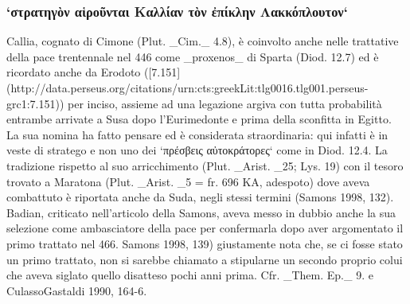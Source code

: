 {            \subsubsection{`στρατηγὸν αἱροῦνται Καλλίαν τὸν ἐπίκλην Λακκόπλουτον`}
            Callia, cognato di  Cimone (Plut. _Cim._ 4.8), è coinvolto anche nelle trattative della pace trentennale nel 446 come _proxenos_ di Sparta (Diod. 12.7) ed è ricordato anche da Erodoto ([7.151](http://data.perseus.org/citations/urn:cts:greekLit:tlg0016.tlg001.perseus-grc1:7.151)) per inciso, assieme ad una legazione argiva con tutta probabilità entrambe arrivate a Susa dopo l'Eurimedonte e prima della sconfitta in Egitto. La sua nomina ha fatto pensare ed è considerata straordinaria: qui infatti è in veste di stratego e non uno dei `πρέσβεις αὐτοκράτορες` come in Diod. 12.4. La tradizione rispetto al suo arricchimento (Plut. _Arist. _25; Lys. 19) con il tesoro trovato a Maratona (Plut. _Arist. _5 = fr. 696 KA, adespoto) dove aveva combattuto è riportata anche da Suda, negli stessi termini  (Samons 1998, 132). Badian, criticato nell'articolo della Samons, aveva messo in dubbio anche la sua selezione come ambasciatore della pace per confermarla dopo aver argomentato il primo trattato nel 466. Samons 1998, 139) giustamente nota che, se ci fosse stato un primo trattato, non si sarebbe chiamato a stipularne un secondo proprio colui che aveva siglato quello disatteso pochi anni prima. Cfr. _Them. Ep._  9. e CulassoGastaldi 1990, 164-6. 
}
